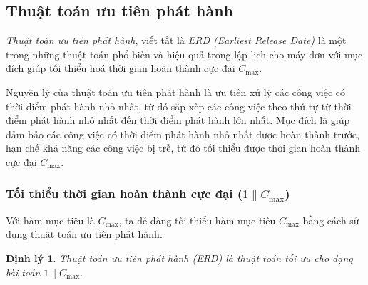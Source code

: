 \documentclass[12pt,a4paper]{report}
\newtheorem{dl}{Định lý}
\begin{document}
\subsection{Thuật toán ưu tiên phát hành}

\textit{Thuật toán ưu tiên phát hành}, viết tắt là \textit{ERD (Earliest Release Date)} là một trong những thuật toán phổ biến và hiệu quả trong lập lịch cho máy đơn với mục đích giúp tối thiểu hoá thời gian hoàn thành cực đại $C_{\max}$.

Nguyên lý của thuật toán ưu tiên phát hành là ưu tiên xử lý các công việc có thời điểm phát hành nhỏ nhất, từ đó sắp xếp các công việc theo thứ tự từ thời điểm phát hành nhỏ nhất đến thời điểm phát hành lớn nhất. Mục đích là giúp đảm bảo các công việc có thời điểm phát hành nhỏ nhất được hoàn thành trước, hạn chế khả năng các công việc bị trễ, từ đó tối thiểu được thời gian hoàn thành cực đại $C_{\max}$.

\subsubsection*{Tối thiểu thời gian hoàn thành cực đại ($1 \| C_{\max}$)}
Với hàm mục tiêu là $C_{\max}$, ta dễ dàng tối thiểu hàm mục tiêu $C_{\max}$ bằng cách sử dụng thuật toán ưu tiên phát hành.

\begin{dl}
	Thuật toán ưu tiên phát hành (ERD) là thuật toán tối ưu cho dạng bài toán $1 \| C_{\max}$.
\end{dl}
\end{document}
